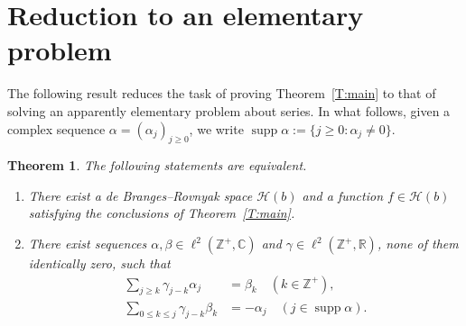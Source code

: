 \documentclass[11pt,reqno]{amsart}
\theoremstyle{plain}
\newtheorem{theorem}{Theorem}[section]
\theoremstyle{definition}
\theoremstyle{remark}
\newcommand{\cH}{\mathcal{H}}
\newcommand{\CC}{\mathbb{C}}
\newcommand{\RR}{\mathbb{R}}
\newcommand{\ZZ}{\mathbb{Z}}
\DeclareMathOperator{\supp}{supp}
\begin{document}

\section{Reduction to an elementary problem}\label{S:equiv}




The following result reduces the task of proving
Theorem~\ref{T:main} to that of solving an apparently
elementary problem about series.
In what follows,  
given a complex sequence $\alpha=(\alpha_j)_{j\ge0}$, 
we write
$\supp\alpha:=\{j\ge0:\alpha_j\ne0\}$.

\begin{theorem}\label{T:equiv}
The following statements are equivalent.
\begin{enumerate}[\normalfont(i)]
\item There exist a de Branges--Rovnyak space $\cH(b)$ and a
function $f\in\cH(b)$ satisfying the conclusions of
Theorem~\ref{T:main}.
\item There exist sequences $\alpha,\beta\in\ell^2(\ZZ^+,\CC)$ and $\gamma\in\ell^2(\ZZ^+,\RR)$, none of them identically zero,  such that
\begin{align}
\label{E:cond1}\sum_{j\ge k}\gamma_{j-k}\alpha_{j}&=\beta_k \quad(k\in\ZZ^+),\\ 
\label{E:cond2}\sum_{0\le k\le j}\gamma_{j-k}\beta_k&=-\alpha_j  \quad(j\in \supp\alpha).
\end{align}
\end{enumerate}
\end{theorem}
\end{document}
